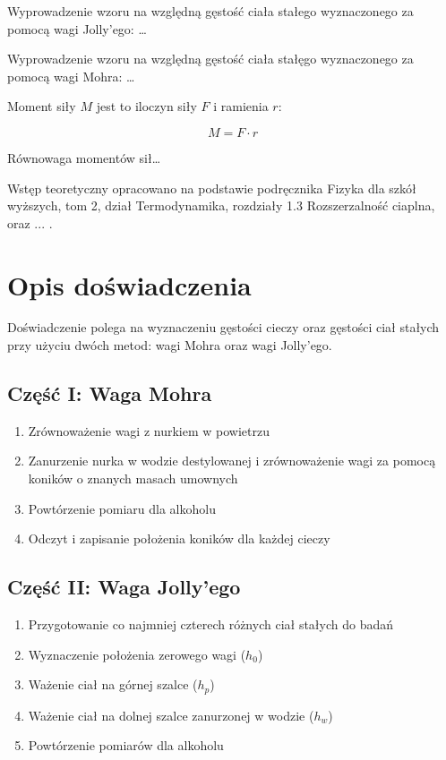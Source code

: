\documentclass[a4paper,12pt]{article}
\begin{document}
Wyprowadzenie wzoru na względną gęstość ciała stałego wyznaczonego za pomocą wagi Jolly'ego:
\ldots

Wyprowadzenie wzoru na względną gęstość ciała stałęgo wyznaczonego za pomocą wagi Mohra:
\ldots

Moment siły $M$ jest to iloczyn siły $F$ i ramienia $r$:

\begin{equation*}
    M = F \cdot r
\end{equation*}

Równowaga momentów sił\dots

Wstęp teoretyczny opracowano na podstawie podręcznika Fizyka dla szkół wyższych, tom 2, dział Termodynamika, rozdziały 1.3 Rozszerzalność ciaplna, oraz ... \cite{fizyka_dla_szkół_wyższych_tom_2}.



\section{Opis doświadczenia}

Doświadczenie polega na wyznaczeniu gęstości cieczy oraz gęstości ciał stałych przy użyciu dwóch metod: wagi Mohra oraz wagi Jolly'ego.

\subsection*{Część I: Waga Mohra}
\begin{enumerate}
    \setlength{\itemsep}{0em}
    \item Zrównoważenie wagi z nurkiem w powietrzu
    \item Zanurzenie nurka w wodzie destylowanej i zrównoważenie wagi za pomocą koników o znanych masach umownych
    \item Powtórzenie pomiaru dla alkoholu
    \item Odczyt i zapisanie położenia koników dla każdej cieczy
\end{enumerate}

\subsection*{Część II: Waga Jolly'ego}
\begin{enumerate}
    \setlength{\itemsep}{0em}
    \item Przygotowanie co najmniej czterech różnych ciał stałych do badań
    \item Wyznaczenie położenia zerowego wagi ($h_0$)
    \item Ważenie ciał na górnej szalce ($h_p$)
    \item Ważenie ciał na dolnej szalce zanurzonej w wodzie ($h_w$)
    \item Powtórzenie pomiarów dla alkoholu
\end{enumerate}
\end{document}
